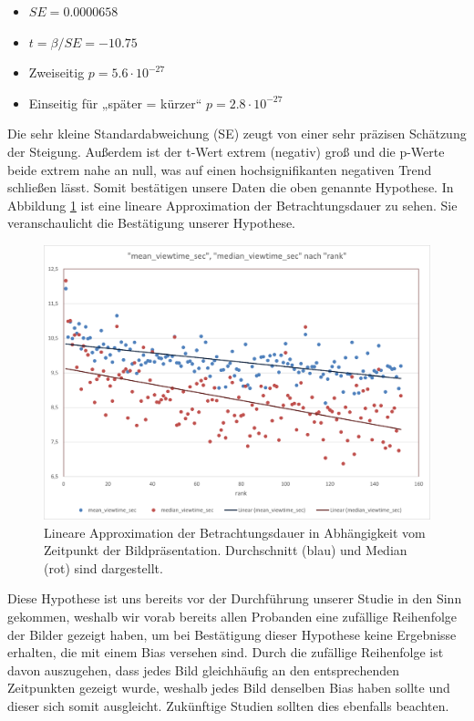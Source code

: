 \documentclass[
    language=german, %
    thesis=seminar, %
    supervisor=postdoc, %
    multiauthor=true, %
    ]{settings/csssa-thesis}
\begin{document}
\begin{itemize}
  \item $SE = 0.0000658$
  \item $t = \beta / SE = -10.75$
  \item Zweiseitig $p = 5.6 \cdot 10^{-27}$
  \item Einseitig für „später = kürzer“ $p = 2.8 \cdot 10^{-27}$
\end{itemize}


Die sehr kleine Standardabweichung (SE) zeugt von einer sehr präzisen Schätzung der Steigung.  
Außerdem ist der t-Wert extrem (negativ) groß und die p-Werte beide extrem nahe an null,
was auf einen hochsignifikanten negativen Trend schließen lässt. Somit bestätigen unsere
Daten die oben genannte Hypothese. In Abbildung \ref{fig:lineareAppox} ist eine lineare Approximation der
Betrachtungsdauer zu sehen. Sie veranschaulicht die Bestätigung unserer Hypothese. 

\begin{figure}[h]
    \centering
    \includegraphics[width=\linewidth,height=0.8\textheight,keepaspectratio]{figures/Bild1.png}
    \caption{Lineare Approximation der Betrachtungsdauer in Abhängigkeit vom Zeitpunkt der Bildpräsentation. Durchschnitt (blau) und Median (rot) sind dargestellt.}
    \label{fig:lineareAppox}
\end{figure}

Diese Hypothese ist uns bereits vor der Durchführung unserer Studie in den Sinn gekommen, 
weshalb wir vorab bereits allen Probanden eine zufällige Reihenfolge der Bilder gezeigt haben, 
um bei Bestätigung dieser Hypothese keine Ergebnisse erhalten, die mit einem Bias versehen sind. 
Durch die zufällige Reihenfolge ist davon auszugehen, dass jedes Bild gleichhäufig an den entsprechenden 
Zeitpunkten gezeigt wurde, weshalb jedes Bild denselben Bias haben sollte und dieser sich somit ausgleicht. 
Zukünftige Studien sollten dies ebenfalls beachten. 
\end{document}
